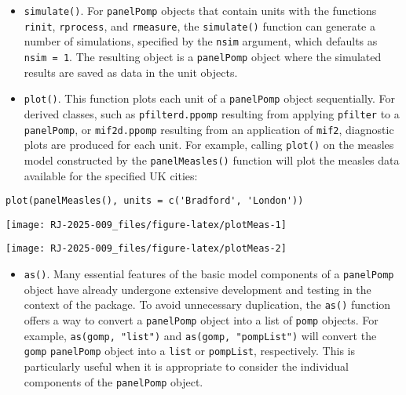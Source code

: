 \begin{itemize}
\tightlist
\item
  \texttt{simulate()}. For \texttt{panelPomp} objects that contain units with the functions \texttt{rinit}, \texttt{rprocess}, and \texttt{rmeasure}, the \texttt{simulate()} function can generate a number of simulations, specified by the \texttt{nsim} argument, which defaults as \texttt{nsim\ =\ 1}. The resulting object is a \texttt{panelPomp} object where the simulated results are saved as data in the unit objects.
\item
  \texttt{plot()}. This function plots each unit of a \texttt{panelPomp} object sequentially. For derived classes, such as \texttt{pfilterd.ppomp} resulting from applying \texttt{pfilter} to a \texttt{panelPomp}, or \texttt{mif2d.ppomp} resulting from an application of \texttt{mif2}, diagnostic plots are produced for each unit. For example, calling \texttt{plot()} on the measles model constructed by the \texttt{panelMeasles()} function will plot the measles data available for the specified UK cities:
\end{itemize}

\begin{verbatim}
plot(panelMeasles(), units = c('Bradford', 'London'))
\end{verbatim}

\begin{center}\texttt{[image: RJ-2025-009\_files/figure-latex/plotMeas-1]} \end{center}

\begin{center}\texttt{[image: RJ-2025-009\_files/figure-latex/plotMeas-2]} \end{center}

\begin{itemize}
\tightlist
\item
  \texttt{as()}. Many essential features of the basic model components of a \texttt{panelPomp} object have already undergone extensive development and testing in the context of the  package.
  To avoid unnecessary duplication, the \texttt{as()} function offers a way to convert a \texttt{panelPomp} object into a list of \texttt{pomp} objects.
  For example, \texttt{as(gomp,\ "list")} and \texttt{as(gomp,\ "pompList")} will convert the \texttt{gomp} \texttt{panelPomp} object into a \texttt{list} or \texttt{pompList}, respectively.
  This is particularly useful when it is appropriate to consider the individual components of the \texttt{panelPomp} object.
\end{itemize}

